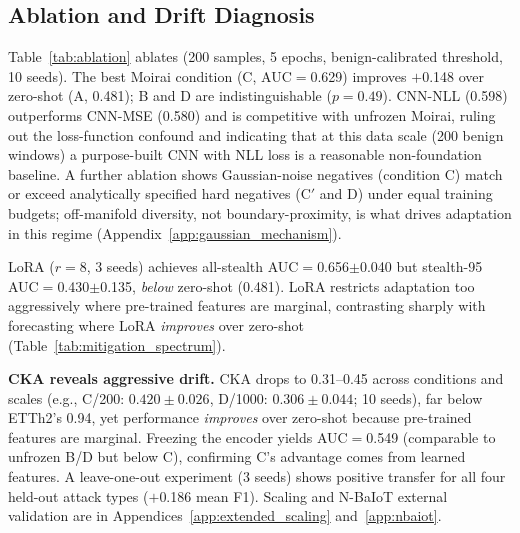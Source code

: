 \subsection{Ablation and Drift Diagnosis}
\label{sec:experiments:ablation}



Table~\ref{tab:ablation} ablates \ours{} (200 samples, 5 epochs,
benign-calibrated threshold, 10 seeds).
The best Moirai condition (C, AUC$=$0.629) improves $+$0.148 over zero-shot
(A, 0.481); B and D are indistinguishable ($p{=}0.49$).
CNN-NLL (0.598) outperforms CNN-MSE (0.580) and is competitive with
unfrozen Moirai, ruling out the loss-function confound and indicating
that at this data scale (200 benign windows) a purpose-built CNN with
NLL loss is a reasonable non-foundation baseline.
A further ablation shows Gaussian-noise negatives (condition C) match or
exceed analytically specified hard negatives (C$'$ and D) under equal
training budgets; off-manifold diversity, not boundary-proximity, is
what drives adaptation in this regime (Appendix~\ref{app:gaussian_mechanism}).

LoRA ($r{=}8$, 3 seeds) achieves all-stealth AUC$=$0.656$\pm$0.040 but
stealth-95 AUC$=$0.430$\pm$0.135, \emph{below} zero-shot (0.481).
LoRA restricts adaptation too aggressively where pre-trained features
are marginal, contrasting sharply with forecasting where LoRA
\emph{improves} over zero-shot (Table~\ref{tab:mitigation_spectrum}).

\label{sec:experiments:constraints}

\textbf{CKA reveals aggressive drift.}
CKA drops to 0.31--0.45 across conditions and scales
(e.g., C/200: $0.420\pm0.026$, D/1000: $0.306\pm0.044$; 10 seeds),
far below ETTh2's 0.94, yet performance
\emph{improves} over zero-shot because pre-trained features are marginal.
Freezing the encoder yields AUC$=$0.549 (comparable to unfrozen B/D
but below C), confirming C's advantage comes from learned features.
A leave-one-out experiment (3 seeds) shows positive transfer for all
four held-out attack types ($+$0.186 mean F1).
Scaling and N-BaIoT external validation are in
Appendices~\ref{app:extended_scaling} and~\ref{app:nbaiot}.
